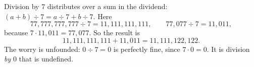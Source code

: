 Division by $7$ distributes over a sum in the dividend: $(a+b)\div7=a\div7+b\div7$. Here
\[77{,}777{,}777{,}777\div7=11{,}111{,}111{,}111,\qquad 77{,}077\div7=11{,}011,\]
because $7\cdot11{,}011=77{,}077$. So the result is
\[11{,}111{,}111{,}111+11{,}011=\boxed{11{,}111{,}122{,}122}.\]
The worry is unfounded: $0\div7=0$ is perfectly fine, since $7\cdot0=0$. It is division \emph{by} $0$ that is undefined.

